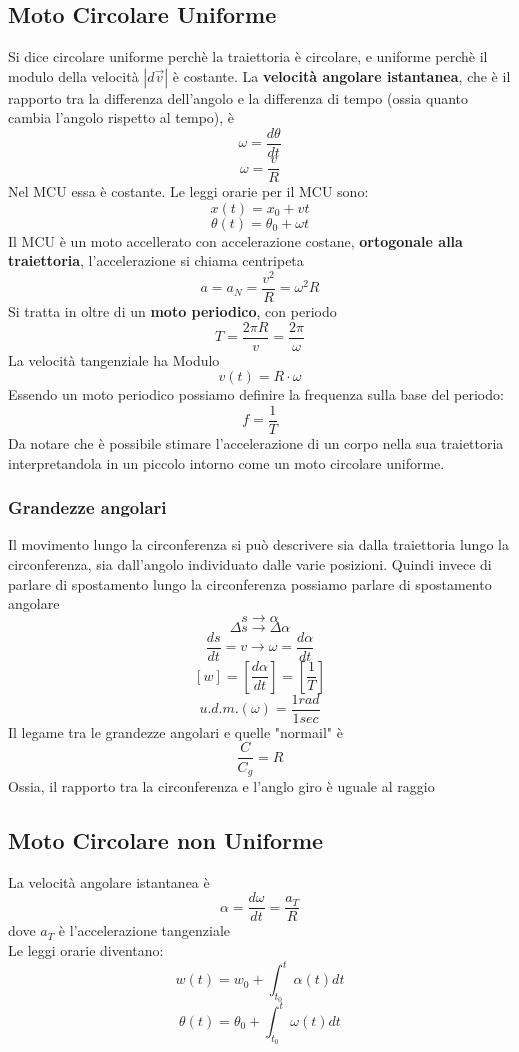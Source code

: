 \documentclass[a4paper]{report}
\begin{document}
  \subsection{Moto Circolare Uniforme}
  Si dice circolare uniforme perchè la traiettoria è circolare, e uniforme perchè il modulo della velocità $|d\vec{v}|$ è costante.
  La \textbf{velocità angolare istantanea}, che è il rapporto tra la differenza dell'angolo e la differenza di tempo (ossia quanto cambia l'angolo rispetto al tempo), è
  $$ \omega = \frac{d\theta}{dt} $$
  $$ \omega = \frac{v}{R} $$
  Nel MCU essa è costante. Le leggi orarie per il MCU sono:
  $$ x(t) =x_0 + vt$$
  $$ \theta(t) = \theta_0 + \omega t$$
  Il MCU è un moto accellerato con accelerazione costane, \textbf{ortogonale alla traiettoria}, l'accelerazione si chiama centripeta
  $$ a= a_N = \frac{v^2}{R} = \omega^2 R$$
  Si tratta in oltre di un \textbf{moto periodico}, con periodo
  $$ T=\frac{2\pi R}{v} = \frac{2\pi}{\omega} $$
  La velocità tangenziale ha Modulo
  $$ v(t) = R \cdot \omega $$
  Essendo un moto periodico possiamo definire la frequenza sulla base del periodo:
  $$ f = \frac{1}{T}$$
  Da notare che è possibile stimare l'accelerazione di un corpo nella sua traiettoria interpretandola in un piccolo intorno come un moto circolare uniforme.
  \subsubsection{Grandezze angolari}
  Il movimento lungo la circonferenza si può descrivere sia dalla traiettoria lungo la circonferenza, sia dall'angolo individuato dalle varie posizioni. Quindi invece di parlare di spostamento lungo la circonferenza possiamo parlare di spostamento angolare
  $$ s \rightarrow \alpha$$
  $$ \Delta s \rightarrow \Delta \alpha$$
  $$ \frac{ds}{dt} = v \rightarrow \omega = \frac{d\alpha}{dt}$$
  $$[w] = [\frac{d\alpha}{dt}] = [\frac{1}{T}]$$
  $$ u.d.m.(\omega) = \frac{1 rad}{1 sec}$$
  Il legame tra le grandezze angolari e quelle "normail" è
  $$\frac{C}{C_g} = R$$
  Ossia, il rapporto tra la circonferenza e l'anglo giro è uguale al raggio

  \subsection{Moto Circolare non Uniforme}
  La velocità angolare istantanea è
  $$ \alpha = \frac{d\omega}{dt} = \frac{a_T}{R} $$
  dove $a_T$ è l'accelerazione tangenziale\\
  Le leggi orarie diventano:
  $$ w(t) = w_0 + \int_{t_0}^t \alpha(t) dt $$
  $$ \theta(t) = \theta_0 + \int_{t_0}^t \omega(t) dt $$
\end{document}
